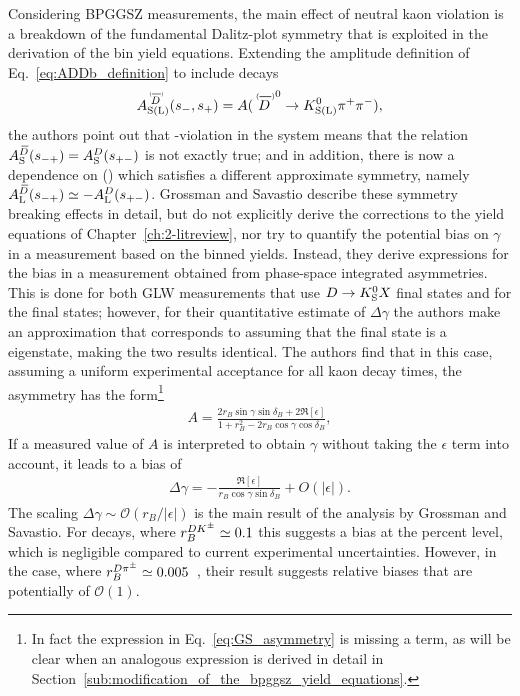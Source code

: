 Considering BPGGSZ measurements, the main effect of neutral kaon \CP violation is a breakdown of the fundamental Dalitz-plot symmetry that is exploited in the derivation of the bin yield equations. Extending the amplitude definition of Eq.~\eqref{eq:ADDb_definition} to include \KL decays
\begin{align}\label{eq:ADDb_definition_with_KL}
\ADorDbSL (\smpLong)= A(\DorDbar^0\to K^0_\text{S(L)} \pi^+\pi^-),
\end{align}
the authors point out that \CP-violation in the \KS system means that the relation $A_{\rm S}^{{\kern 0.18em\overline{\kern -0.18em D}}}(s_{-+})=A_{\rm S}^{D}(s_{+-})$ is not exactly true; and in addition, there is now a dependence on \ADL(\smp) which satisfies a different approximate symmetry, namely ${A_{\rm L}^{{\kern 0.18em\overline{\kern -0.18em D}}}(s_{-+}) \simeq -A_{\rm L}^{D}(s_{+-})}$. Grossman and Savastio describe these symmetry breaking effects in detail, but do not explicitly derive the corrections to the yield equations of Chapter~\ref{ch:2-litreview}, nor try to quantify the potential bias on $\gamma$ in a measurement based on the binned yields. Instead, they derive expressions for the bias in a measurement obtained from phase-space integrated \CP asymmetries. This is done for both GLW measurements that use ${D}\rightarrow{\ensuremath{{K}^0_{\mathrm{S}}}} X$ final states and for the \DtoKshh final states; however, for their quantitative estimate of $\Delta \gamma$ the authors make an approximation that corresponds to assuming that the \DtoKshh final state is a \CP eigenstate, making the two results identical. The authors find that in this case, assuming a uniform experimental acceptance for all kaon decay times, the asymmetry has the form\footnote{In fact the expression in Eq.~\eqref{eq:GS_asymmetry} is missing a term, as will be clear when an analogous expression is derived in detail in Section~\ref{sub:modification_of_the_bpggsz_yield_equations}.}
\begin{align}\label{eq:GS_asymmetry}
    A = \frac{2r_B\sin \gamma \sin \delta_B + 2 \Re [\epsilon]}{1+r_B^2-2r_B\cos \gamma \cos \delta_B},
\end{align}
If a measured value of $A$ is interpreted to obtain $\gamma$ without taking the $\epsilon$ term into account, it leads to a bias of
\begin{align}
    \Delta \gamma = -\frac{\Re [\epsilon]}{r_B \cos \gamma \sin \delta_B} + O(|\epsilon|).
\end{align}
The scaling $\Delta\gamma\sim\mathcal O(r_B/|\epsilon|)$ is the main result of the analysis by Grossman and Savastio. For \BtoDK decays, where $r_B^{{{D}{{K}^\pm}}}\simeq 0.1$ this suggests a bias at the percent level, which is negligible compared to current experimental uncertainties. However, in the \BtoDpi case, where $r_B^{D\pi^\pm}\simeq 0.005$~\cite{rDpi}, their result suggests relative biases that are potentially of $\mathcal O (1)$.


